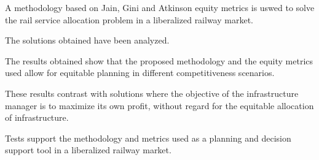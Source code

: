 \documentclass[preprint,12pt]{elsarticle}
\begin{document}
\begin{frontmatter}
\begin{abstract}
Over the last few decades, European rail transport has undergone major changes as part of the process of liberalization set out in European regulations. In this context of liberalization, railway undertakings compete with each other for the limited infrastructure capacity available to offer their rail services. The infrastructure manager is responsible for the equitable allocation of infrastructure between all companies in the market, which is essential to ensure the efficiency and sustainability of this competitive ecosystem. In this paper, a methodology based on Jain, Gini and Atkinson equity metrics is used to solve the rail service allocation problem in a liberalized railway market, analyzing the solutions obtained. The results show that the proposed methodology and the equity metrics used allow for equitable planning in different competitiveness scenarios. These results contrast with solutions where the objective of the infrastructure manager is to maximize its own profit, without regard for the equitable allocation of infrastructure. Therefore, the computational tests support the methodology and metrics used as a planning and decision support tool in a liberalized railway market.
\end{abstract}


\begin{highlights}
\item A methodology based on Jain, Gini and Atkinson equity metrics is uswed to solve the rail service allocation problem in a liberalized railway market.

\item The solutions obtained have been analyzed.

\item The results obtained show that the proposed methodology and the equity metrics used allow for equitable planning in different competitiveness scenarios.

\item These results contrast with solutions where the objective of the infrastructure manager is to maximize its own profit, without regard for the equitable allocation of infrastructure.

\item Tests support the methodology and metrics used as a planning and decision support tool in a liberalized railway market.


\end{highlights}
\end{frontmatter}
\end{document}
